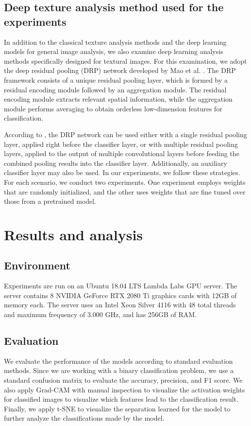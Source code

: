 \documentclass{aci}
\numberwithin{equation}{section}
\begin{document}
\subsection{Deep texture analysis method used for the experiments}

In addition to the classical texture analysis methods and the deep learning
models for general image analysis, we also examine deep learning analysis
methods specifically designed for textural images. For this examination, we
adopt the deep residual pooling (DRP) network developed by Mao et al.
\cite{mao_deep_2021}. The DRP framework consists of a unique residual pooling
layer, which is formed by a residual encoding module followed by an aggregation
module. The residual encoding module extracts relevant spatial information,
while the aggregation module performs averaging to obtain orderless
low-dimension features for classification.

According to \cite{mao_deep_2021}, the DRP network can be used either with a
single residual pooling layer, applied right before the classifier layer, or
with multiple residual pooling layers, applied to the output of multiple
convolutional layers before feeding the combined pooling results into the
classifier layer. Additionally, an auxiliary classifier layer may also be used.
In our experiments, we follow these strategies. For each scenario, we conduct
two experiments. One experiment employs weights that are randomly initialized,
and the other uses weights that are fine tuned over those from a pretrained
model.

\section{Results and analysis}
\subsection{Environment}

Experiments are run on an Ubuntu 18.04 LTS Lambda Labs GPU server. The server
contains 8 NVIDIA GeForce RTX 2080 Ti graphics cards with 12GB of memory each.
The server uses an Intel Xeon Silver 4116 with 48 total threads and maximum
frequency of 3.000 GHz, and has 256GB of RAM.

\subsection{Evaluation}

We evaluate the performance of the models according to standard evaluation
methods. Since we are working with a binary classification problem, we use a
standard confusion matrix to evaluate the accuracy, precision, and F1 score. We
also apply Grad-CAM with manual inspection to visualize the activation weights
for classified images to visualize which features lead to the classification
result. Finally, we apply t-SNE to visualize the separation learned for the
model to further analyze the classifications made by the model.
\end{document}
